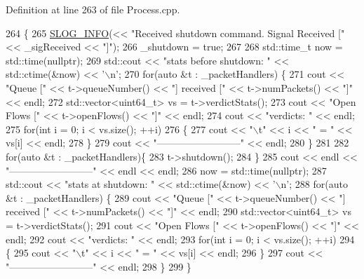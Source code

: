 Definition at line 263 of file Process.\-cpp.


\begin{DoxyCode}
264 \{
265     \hyperlink{_logger_8h_a119c1c29ba35a8db38e2358e41167282}{SLOG\_INFO}(<< \textcolor{stringliteral}{"Received shutdown command. Signal Received ["} << \_sigReceived << \textcolor{stringliteral}{"]"});
266     \_shutdown = \textcolor{keyword}{true};
267 
268     std::time\_t now = std::time(\textcolor{keyword}{nullptr});
269     std::cout << \textcolor{stringliteral}{"stats before shutdown: "} << std::ctime(&now) << \textcolor{charliteral}{'\(\backslash\)n'};
270     \textcolor{keywordflow}{for}(\textcolor{keyword}{auto} &t : \_packetHandlers) \{
271         cout << \textcolor{stringliteral}{"Queue ["} << t->queueNumber() << \textcolor{stringliteral}{"] received ["} << t->numPackets() << \textcolor{stringliteral}{"]"} << endl;
272         std::vector<uint64\_t> vs = t->verdictStats();
273         cout << \textcolor{stringliteral}{"Open Flows ["}  << t->openFlows() << \textcolor{stringliteral}{"]"} << endl;
274         cout << \textcolor{stringliteral}{"verdicts: "} << endl;
275         \textcolor{keywordflow}{for}(\textcolor{keywordtype}{int} i = 0; i < vs.size(); ++i)
276         \{
277             cout << \textcolor{stringliteral}{"\(\backslash\)t"} << i << \textcolor{stringliteral}{" = "} << vs[i] << endl;
278         \}
279         cout << \textcolor{stringliteral}{"--------------------------"} << endl;
280     \}
281 
282     \textcolor{keywordflow}{for}(\textcolor{keyword}{auto} &t : \_packetHandlers)\{
283         t->shutdown();
284     \}
285     cout << endl << \textcolor{stringliteral}{"--------------------------"} << endl << endl;
286     now = std::time(\textcolor{keyword}{nullptr});
287     std::cout << \textcolor{stringliteral}{"stats at shutdown: "} << std::ctime(&now) << \textcolor{charliteral}{'\(\backslash\)n'};
288     \textcolor{keywordflow}{for}(\textcolor{keyword}{auto} &t : \_packetHandlers) \{
289         cout << \textcolor{stringliteral}{"Queue ["} << t->queueNumber() << \textcolor{stringliteral}{"] received ["} << t->numPackets() << \textcolor{stringliteral}{"]"} << endl;
290         std::vector<uint64\_t> vs = t->verdictStats();
291         cout << \textcolor{stringliteral}{"Open Flows ["}  << t->openFlows() << \textcolor{stringliteral}{"]"} << endl;
292         cout << \textcolor{stringliteral}{"verdicts: "} << endl;
293         \textcolor{keywordflow}{for}(\textcolor{keywordtype}{int} i = 0; i < vs.size(); ++i)
294         \{
295             cout << \textcolor{stringliteral}{"\(\backslash\)t"} << i << \textcolor{stringliteral}{" = "} << vs[i] << endl;
296         \}
297         cout << \textcolor{stringliteral}{"--------------------------"} << endl;
298     \}
299 \}
\end{DoxyCode}
